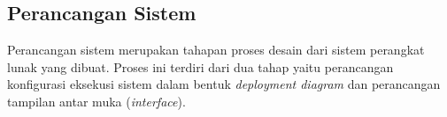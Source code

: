 \begin{enumerate}[a.]
\subsection{Perancangan Sistem}
\par Perancangan sistem merupakan tahapan proses desain dari sistem perangkat lunak yang dibuat. Proses ini terdiri dari dua tahap yaitu perancangan konfigurasi eksekusi sistem dalam bentuk \textit{deployment diagram} dan perancangan tampilan antar muka (\textit{interface}).




\end{enumerate}
